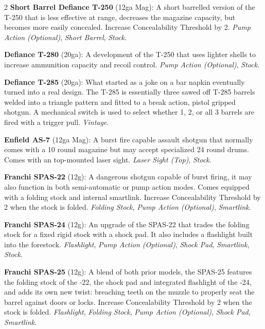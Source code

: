 \documentclass[
  oneside]{article}
\begin{document}
\begin{multicols}{2}
\textbf{Short Barrel Defiance T-250} (12ga Mag): A
short barrelled version of the T-250 that is less
effective at range, decreases the magazine
capacity, but becomes more easily concealed.
Increase Concealability Threshold by 2. \emph{Pump
Action (Optional)}, \emph{Short Barrel},
\emph{Stock}.

\textbf{Defiance T-280} (20ga): A development of
the T-250 that uses lighter shells to increase
ammunition capacity and recoil control. \emph{Pump
Action (Optional)}, \emph{Stock}.

\textbf{Defiance T-285} (20ga): What started as a
joke on a bar napkin eventually turned into a real
design. The T-285 is essentially three sawed off
T-285 barrels welded into a triangle pattern and
fitted to a break action, pistol gripped shotgun.
A mechanical switch is used to select whether 1,
2, or all 3 barrels are fired with a trigger pull.
\emph{Vintage}.

\textbf{Enfield AS-7} (12ga Mag): A burst fire
capable assault shotgun that normally comes with a
10 round magazine but may accept specialized 24
round drums. Comes with an top-mounted laser
sight. \emph{Laser Sight (Top)}, \emph{Stock}.

\textbf{Franchi SPAS-22} (12g): A dangerous
shotgun capable of burst firing, it may also
function in both semi-automatic or pump action
modes. Comes equipped with a folding stock and
internal smartlink. Increase Concealability
Threshold by 2 when the stock is folded.
\emph{Folding Stock}, \emph{Pump Action
(Optional)}, \emph{Smartlink}.

\textbf{Franchi SPAS-24} (12g): An upgrade of the
SPAS-22 that trades the folding stock for a fixed
rigid stock with a shock pad. It also includes a
flashlight built into the forestock.
\emph{Flashlight}, \emph{Pump Action (Optional)},
\emph{Shock Pad}, \emph{Smartlink}, \emph{Stock}.

\textbf{Franchi SPAS-25} (12g): A blend of both
prior models, the SPAS-25 features the folding
stock of the -22, the shock pad and integrated
flashlight of the -24, and adds its own new twist:
breaching teeth on the muzzle to properly seat the
barrel against doors or locks. Increase
Concealability Threshold by 2 when the stock is
folded. \emph{Flashlight}, \emph{Folding Stock},
\emph{Pump Action (Optional)}, \emph{Shock Pad},
\emph{Smartlink}.


\end{multicols}
\end{document}
